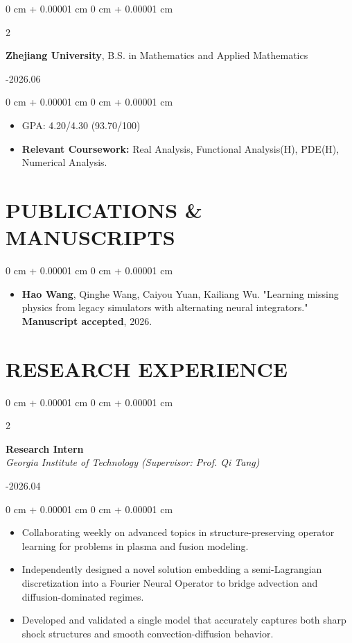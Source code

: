 \documentclass[10pt, letterpaper]{article}
\newenvironment{highlights}{
    \begin{itemize}[
        topsep=0.10 cm,
        parsep=0.10 cm,
        partopsep=0pt,
        itemsep=0pt,
        leftmargin=0 cm + 10pt
    ]
}{
    \end{itemize}
} %
\newenvironment{onecolentry}{
    \begin{adjustwidth}{
        0 cm + 0.00001 cm
    }{
        0 cm + 0.00001 cm
    }
}{
    \end{adjustwidth}
} %
\newenvironment{twocolentry}[2][]{
    \onecolentry
    \def\secondColumn{#2}
    \setcolumnwidth{\fill, 4.5 cm}
    \begin{paracol}{2}
}{
    \switchcolumn \raggedleft \secondColumn
    \end{paracol}
    \endonecolentry
} %
\begin{document}
        \begin{twocolentry}{
            2022.09-2026.06
        }
            \textbf{Zhejiang University}, B.S. in Mathematics and Applied Mathematics
        \end{twocolentry}

        \vspace{0.10 cm}
        \begin{onecolentry}  
            \begin{highlights}  
                \item GPA: 4.20/4.30 (93.70/100)
                \item \textbf{Relevant Coursework:} Real Analysis, Functional Analysis(H), PDE(H), Numerical Analysis.
            \end{highlights}  
        \end{onecolentry} 
    
    \section{PUBLICATIONS \& MANUSCRIPTS}
        \begin{onecolentry}
            \begin{highlights}
                \item \textbf{Hao Wang}, Qinghe Wang, Caiyou Yuan, Kailiang Wu. "Learning missing physics from legacy simulators with alternating neural integrators." \textbf{Manuscript accepted}, 2026.
            \end{highlights}
        \end{onecolentry}
    
    \section{RESEARCH EXPERIENCE}
        \begin{twocolentry}{
            2025.12-2026.04
        }
            \textbf{Research Intern} \\
            \textit{Georgia Institute of Technology (Supervisor: Prof. Qi Tang)}
        \end{twocolentry}

        \vspace{0.10 cm}
        \begin{onecolentry}
            \begin{highlights}
                \item Collaborating weekly on advanced topics in structure-preserving operator learning for problems in plasma and fusion modeling.
                \item Independently designed a novel solution embedding a semi-Lagrangian discretization into a Fourier Neural Operator to bridge advection and diffusion-dominated regimes.
                \item Developed and validated a single model that accurately captures both sharp shock structures and smooth convection-diffusion behavior.
            \end{highlights}
        \end{onecolentry}
\end{document}
